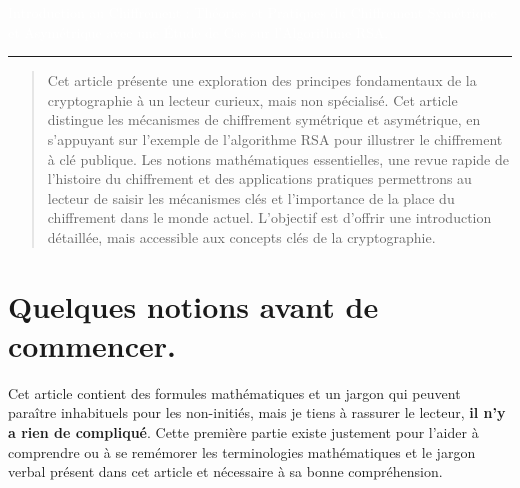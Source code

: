 \documentclass{article}
\author{
	Mathis Lefebvre \\
	\href{mailto:lefebvremathis@proton.me}{\texttt{lefebvremathis@proton.me}}\\ \vspace{60pt} 
	\today
	}
\makeatletter
\newenvironment{resume}{%
	\renewcommand{\abstractname}{Résumé}%
	\begin{abstract}
	}{%
	\end{abstract}
}
\def\printauthor{%
	{\large \@author}}
\makeatother
\begin{document}
	
	\begin{titlepage}
		\BgThispage
		\vspace*{2cm}
		\noindent
		\textcolor{white}{\huge Introduction au Chiffrement : Théories et Pratiques du Chiffrement
			Symétrique et Asymétrique avec une Étude de Cas sur l'Algorithme RSA.}
		\vspace*{2.5cm}\par
		\noindent
		\begin{minipage}{0.35\linewidth}
			\begin{flushright}
				\printauthor
			\end{flushright}
		\end{minipage} \hspace{15pt}
		\begin{minipage}{0.02\linewidth}
			\rule{1pt}{175pt}
		\end{minipage} \hspace{-10pt}
		\begin{minipage}{0.6\linewidth}
			\vspace{5pt}
			\begin{resume}
				Cet article présente une exploration des principes fondamentaux de la cryptographie à un lecteur curieux, mais non spécialisé. Cet article distingue les mécanismes de chiffrement symétrique et asymétrique, en s'appuyant sur l'exemple de l'algorithme RSA pour illustrer le chiffrement à clé publique. Les notions mathématiques essentielles, une revue rapide de l'histoire du chiffrement et des applications pratiques permettrons au lecteur de saisir les mécanismes clés et l'importance de la place du chiffrement dans le monde actuel. L'objectif est d'offrir une introduction détaillée, mais accessible aux concepts clés de la cryptographie.
			\end{resume}
		\end{minipage}
	\end{titlepage}
	
	
	\tableofcontents
	\newpage
	

\section{Quelques notions avant de commencer.}\label{notions.}

Cet article contient des formules mathématiques et un jargon qui peuvent
paraître inhabituels pour les non-initiés, mais je tiens à rassurer le lecteur, \textbf{il n'y a rien de compliqué}. 
Cette première partie existe justement pour l'aider à comprendre ou à se remémorer les
terminologies mathématiques et le jargon verbal présent dans cet article
et nécessaire à sa bonne compréhension.
\end{document}

